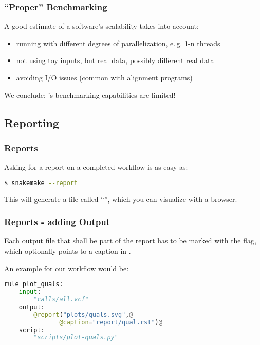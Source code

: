 \begin{frame}
  \frametitle{``Proper'' Benchmarking}
  A good estimate of a software's scalability takes into account:
  \begin{itemize}[<+->]
   \item running with different degrees of parallelization, e.\,g. 1-n threads
   \item not using toy inputs, but real data, possibly different real data
   \item avoiding I/O issues (common with alignment programs)
  \end{itemize}
  \pause
  \begin{warning}
  	We conclude: \Snakemake{}'s benchmarking capabilities are limited!
  \end{warning}
\end{frame}

\subsection{Reporting}

\begin{frame}[fragile]
  \frametitle{\Snakemake{} Reports}
  Asking \Snakemake{} for a report on a completed workflow is as easy as:
  \begin{lstlisting}[language=Bash, style=Shell]
$ snakemake --report
  \end{lstlisting}
  This will generate a file called ``'', which you can visualize with a browser.
\end{frame} 


\begin{frame}[fragile]
  \frametitle{\Snakemake{} Reports - adding Output}
  \begin{docs}
  	 Each output file that shall be part of the report has to be marked with the  flag, which optionally points to a caption in .
  \end{docs}
  An example for our workflow would be:
  \begin{lstlisting}[language=Python,style=Python]
rule plot_quals:
    input:
        "calls/all.vcf"
    output:
        @report("plots/quals.svg",@ 
               @caption="report/qual.rst")@
    script:
        "scripts/plot-quals.py"
  \end{lstlisting}
\end{frame}


